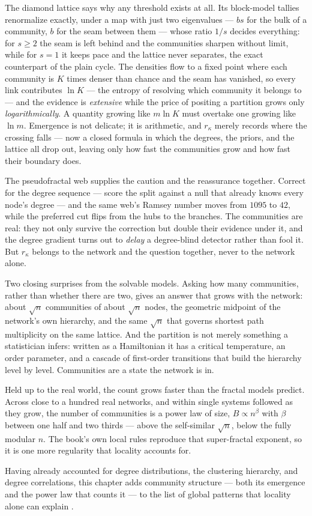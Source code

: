 The diamond lattice says why any threshold exists at all. Its block-model tallies
renormalize exactly, under a map with just two eigenvalues --- $bs$ for the bulk of
a community, $b$ for the seam between them --- whose ratio $1/s$ decides
everything: for $s\ge2$ the seam is left behind and the communities sharpen without
limit, while for $s=1$ it keeps pace and the lattice never separates, the exact
counterpart of the plain cycle. The densities flow to a fixed point where each
community is $K$ times denser than chance and the seam has vanished, so every link
contributes $\ln K$ --- the entropy of resolving which community it belongs to ---
and the evidence is \emph{extensive} while the price of positing a partition grows
only \emph{logarithmically}. A quantity growing like $m\ln K$ must overtake one
growing like $\ln m$. Emergence is not delicate; it is arithmetic, and $r_\kappa$
merely records where the crossing falls --- now a closed formula in which the
degrees, the priors, and the lattice all drop out, leaving only how fast the
communities grow and how fast their boundary does.

The pseudofractal web supplies the caution and the reassurance together. Correct
for the degree sequence --- score the split against a null that already knows every
node's degree --- and the same web's Ramsey number moves from $1095$ to $42$, while
the preferred cut flips from the hubs to the branches. The communities are real:
they not only survive the correction but double their evidence under it, and the
degree gradient turns out to \emph{delay} a degree-blind detector rather than fool
it. But $r_\kappa$ belongs to the network and the question together, never to the
network alone.

Two closing surprises from the solvable models. Asking how many communities,
rather than whether there are two, gives an answer that grows with the network:
about $\sqrt{n}$ communities of about $\sqrt{n}$ nodes, the geometric midpoint of
the network's own hierarchy, and the same $\sqrt{n}$ that governs shortest path
multiplicity on the same lattice. And the partition is not merely something a
statistician infers: written as a Hamiltonian it has a critical temperature, an
order parameter, and a cascade of first-order transitions that build the hierarchy
level by level. Communities are a state the network is in.

Held up to the real world, the count grows faster than the fractal models predict.
Across close to a hundred real networks, and within single systems followed as
they grow, the number of communities is a power law of size, $B\propto n^{\beta}$
with $\beta$ between one half and two thirds --- above the self-similar $\sqrt{n}$,
below the fully modular $n$. The book's own local rules reproduce that
super-fractal exponent, so it is one more regularity that locality accounts for.

Having already accounted for degree distributions, the clustering hierarchy, and
degree correlations, this chapter adds community structure --- both its emergence
and the power law that counts it --- to the list of global patterns that locality
alone can explain \citep{vazquez2025}.
